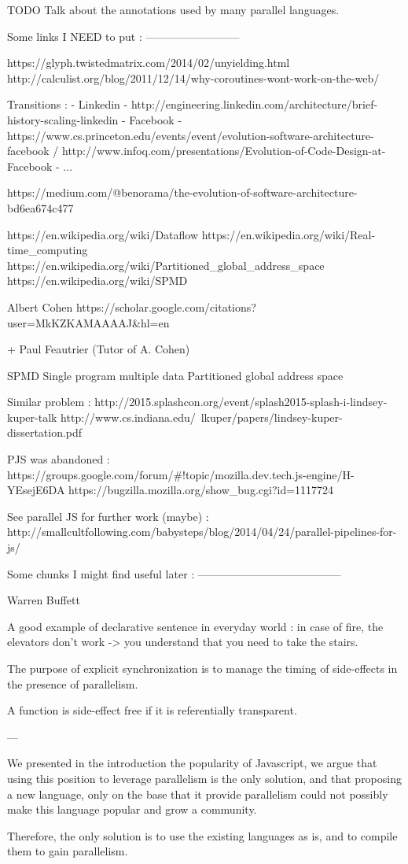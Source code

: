 


TODO Talk about the annotations used by many parallel languages.



Some links I NEED to put :
--------------------------

https://glyph.twistedmatrix.com/2014/02/unyielding.html
http://calculist.org/blog/2011/12/14/why-coroutines-wont-work-on-the-web/

Transitions :
  - Linkedin - http://engineering.linkedin.com/architecture/brief-history-scaling-linkedin
  - Facebook - https://www.cs.princeton.edu/events/event/evolution-software-architecture-facebook / http://www.infoq.com/presentations/Evolution-of-Code-Design-at-Facebook
  - ... 

https://medium.com/@benorama/the-evolution-of-software-architecture-bd6ea674c477

https://en.wikipedia.org/wiki/Dataflow
https://en.wikipedia.org/wiki/Real-time_computing
https://en.wikipedia.org/wiki/Partitioned_global_address_space
https://en.wikipedia.org/wiki/SPMD

Albert Cohen
https://scholar.google.com/citations?user=MkKZKAMAAAAJ&hl=en

+ Paul Feautrier (Tutor of A. Cohen)


SPMD Single program multiple data
Partitioned global address space


Similar problem :
http://2015.splashcon.org/event/splash2015-splash-i-lindsey-kuper-talk
http://www.cs.indiana.edu/~lkuper/papers/lindsey-kuper-dissertation.pdf

PJS was abandoned :
https://groups.google.com/forum/#!topic/mozilla.dev.tech.js-engine/H-YEsejE6DA
https://bugzilla.mozilla.org/show_bug.cgi?id=1117724

See parallel JS for further work (maybe) :
http://smallcultfollowing.com/babysteps/blog/2014/04/24/parallel-pipelines-for-js/

Some chunks I might find useful later :
---------------------------------------

{Warren Buffett}

A good example of declarative sentence in everyday world : in case of fire, 
the elevators don't work -> you understand that you need to take the stairs.

The purpose of explicit synchronization is to manage the timing of side-effects in the presence of parallelism. 

A function is side-effect free if it is referentially transparent.



---


We presented in the introduction the popularity of Javascript, we argue that using this position to leverage parallelism is the only solution, and that proposing a new language, only on the base that it provide parallelism could not possibly make this language popular and grow a community.

Therefore, the only solution is to use the existing languages as is, and to compile them to gain parallelism.